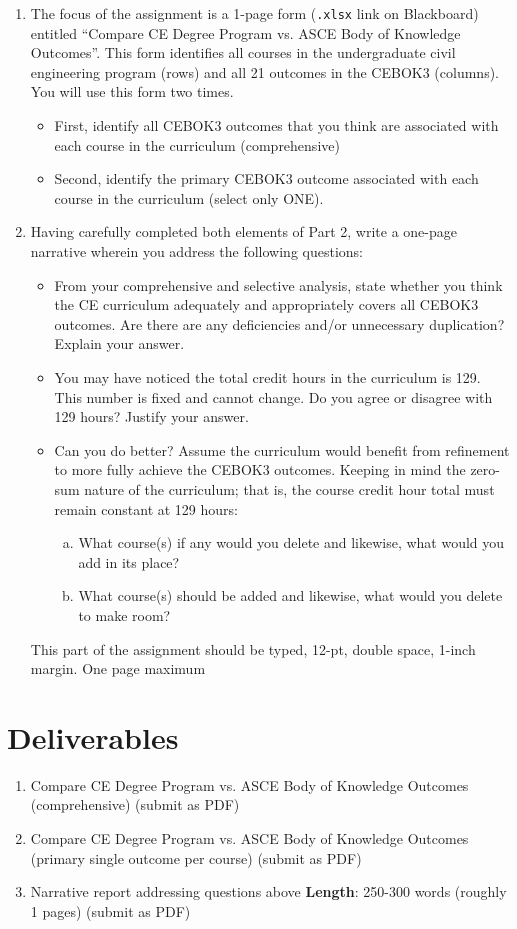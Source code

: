 \documentclass[12pt]{article}
\begin{document}
\begin{enumerate}
    \item The focus of the assignment is a 1-page form (\texttt{.xlsx} link on Blackboard) entitled “Compare CE Degree Program vs. ASCE Body of Knowledge Outcomes”. This form identifies all courses in the undergraduate civil engineering program (rows) and all 21 outcomes in the CEBOK3 (columns). You will use this form two times.
    \begin{itemize}
        \item First, identify all CEBOK3 outcomes that you think are associated with each course in the curriculum (comprehensive)
        \item Second, identify the primary CEBOK3 outcome associated with each course in the curriculum (select only ONE).
    \end{itemize}
    \item Having carefully completed both elements of Part 2, write a one-page narrative wherein you address the following questions:
    \begin{itemize}
        \item From your comprehensive and selective analysis, state whether you think the CE curriculum
adequately and appropriately covers all CEBOK3 outcomes. Are there are any deficiencies
and/or unnecessary duplication? Explain your answer.
        \item You may have noticed the total credit hours in the curriculum is 129. This number is fixed and
cannot change. Do you agree or disagree with 129 hours? Justify your answer.
        \item Can you do better? Assume the curriculum would benefit from refinement to more fully achieve the CEBOK3 outcomes. Keeping in mind the zero-sum nature of the curriculum; that is, the course credit hour total must remain constant at 129 hours:
        \begin{enumerate}[a)]
            \item What course(s) if any would you delete and likewise, what would you add in its place?
            \item What course(s) should be added and likewise, what would you delete to make room?
        \end{enumerate}
    \end{itemize}
This part of the assignment should be typed, 12-pt, double space, 1-inch margin. One page maximum
\end{enumerate}

\section*{\small{Deliverables}}
\begin{enumerate}
    \item Compare CE Degree Program vs. ASCE Body of Knowledge Outcomes (comprehensive) (submit as PDF)
    \item Compare CE Degree Program vs. ASCE Body of Knowledge Outcomes (primary single outcome per course) (submit as PDF)
    \item Narrative report addressing questions above \textbf{Length}: 250-300 words (roughly 1 pages) (submit as PDF)
\end{enumerate}
\end{document}
